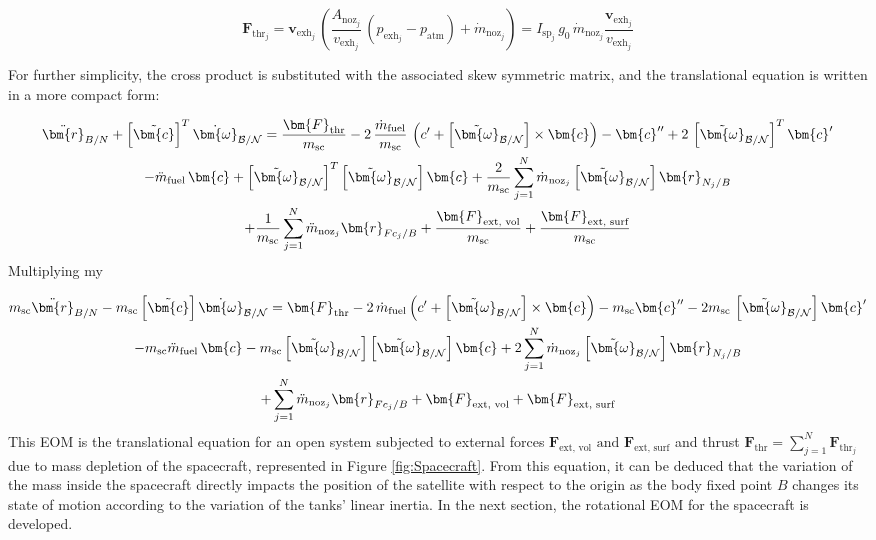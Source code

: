 \begin{equation}\label{eq:IspRel}
	\bm{F}_{\text{thr}_j}= \bm{v}_{\text{exh}_j}\,\left(\frac{A_{\text{noz}_j}}{v_{\text{exh}_j}}\,(p_{\text{exh}_j} - p_{\text{atm}}) + \dot{m}_{\text{noz}_j}\right) = I_{\text{sp}_j}\,g_0\,\dot{m}_{\text{noz}_j}\frac{\bm{v}_{\text{exh}_j}}{v_{\text{exh}_j}}
\end{equation}

For further simplicity, the cross product is substituted with the associated skew symmetric matrix, and the translational equation is written in a more compact form:

\begin{multline}\label{eq:eq29}
	\ddot{\bm{r}}_{B/N} + \left[\tilde{\bm{c}}\right]^T\dot{\bm{\omega}}_{\cal{B}/\cal{N}} =  \frac{\bm{F}_{\text{thr}}}{m_{\text{sc}}} - 2\,\frac{\dot{m}_{\text{fuel}}}{m_{\text{sc}}}\,\left(c' + \left[\tilde{\bm{\omega}}_{\cal{B}/\cal{N}}\right]\times\bm{c}\right) - \bm{c}''+2\,\left[\tilde{\bm{\omega}}_{\cal{B}/\cal{N}}\right]^T
	\bm{c}'\\- \ddot{m}_{\text{fuel}}\,\bm{c} + \left[\tilde{\bm{\omega}}_{\cal{B}/\cal{N}}\right]^T \left[\tilde{\bm{\omega}}_{\cal{B}/\cal{N}}\right] \bm{c} +\frac{2}{m_{\text{sc}}}\sum_{j=1}^{N}\dot{m}_{\text{noz}_j} \left[\tilde{\bm{\omega}}_{\cal{B}/\cal{N}}\right] \bm{r}_{N_j/B}
	\\+ \frac{	1}{m_{\text{sc}}} \sum_{j=1}^{N}\ddot{m}_{\text{noz}_j}\bm{r}_{Fc_j/B}  +\frac{\bm{F}_{\text{ext, vol}}}{m_{\text{sc}}}  + \frac{\bm{F}_{\text{ext, surf}}}{m_{\text{sc}}}
\end{multline}
Multiplying my

\begin{multline}\label{eq:eq30}
m_{\text{sc}} \ddot{\bm{r}}_{B/N} - m_{\text{sc}} \left[\tilde{\bm{c}}\right]\dot{\bm{\omega}}_{\cal{B}/\cal{N}} =  \bm{F}_{\text{thr}} - 2\,\dot{m}_{\text{fuel}} \left(c' + \left[\tilde{\bm{\omega}}_{\cal{B}/\cal{N}}\right]\times\bm{c}\right) - m_{\text{sc}} \bm{c}''-2 m_{\text{sc}} \,\left[\tilde{\bm{\omega}}_{\cal{B}/\cal{N}}\right]
\bm{c}'\\- m_{\text{sc}} \ddot{m}_{\text{fuel}}\,\bm{c} - m_{\text{sc}} \left[\tilde{\bm{\omega}}_{\cal{B}/\cal{N}}\right] \left[\tilde{\bm{\omega}}_{\cal{B}/\cal{N}}\right] \bm{c} +2 \sum_{j=1}^{N}\dot{m}_{\text{noz}_j} \left[\tilde{\bm{\omega}}_{\cal{B}/\cal{N}}\right] \bm{r}_{N_j/B}
\\+ \sum_{j=1}^{N}\ddot{m}_{\text{noz}_j}\bm{r}_{Fc_j/B}  +\bm{F}_{\text{ext, vol}} + \bm{F}_{\text{ext, surf}}
\end{multline}
This EOM is the translational equation for an open system subjected to external forces $\bm{F}_{\text{ext, vol}} \text{ and } \bm{F}_{\text{ext, surf}}$ and thrust $\bm{F}_{\text{thr}}=\sum_{j=1}^{N}\bm{F}_{\text{thr}_j}$ due to mass depletion of the spacecraft, represented in Figure \ref{fig:Spacecraft}.
From this equation, it can be deduced that the variation of the mass inside the spacecraft directly impacts the position of the satellite with respect to the origin as the body fixed point $B$ changes its state of motion according to the variation of the tanks' linear inertia. In the next section, the rotational EOM for the spacecraft is developed.

